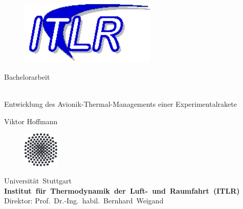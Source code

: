 \begin{titlepage}
\begin{figure}[ht]
     \centering
      \includegraphics[width=65mm]{./Logos/ITLR_Logo.eps}
\end{figure}

\hspace{200mm}

\begin{center}
    \begin{Large}
        Bachelorarbeit
    \end{Large}

    \vspace{2.5mm}

    \BRule
    \vspace{2.5mm}
    \begin{LARGE}
    \\
        Entwicklung des Avionik-Thermal-Managements einer Experimentalrakete
        \\
    \vspace{1mm}
    \end{LARGE}
    \vspace{2.5mm}
    \BRule
    \vspace{15mm}

    \begin{Large}

    Viktor Hoffmann \\
    
\end{Large}

\end{center}

\vfill

\begin{figure}
    \includegraphics[width=17mm]{./Logos/unilogo_neu}
\end{figure}

\parbox[t]{120mm}
{
    \sffamily
      \vspace{3mm}
        Universität~Stuttgart\\
        \textbf{Institut~für~Thermodynamik~der~Luft-~und~Raumfahrt~(ITLR)}\\[2mm]
        Direktor: Prof.~Dr.-Ing.~habil.~Bernhard~Weigand
}




\end{titlepage}
